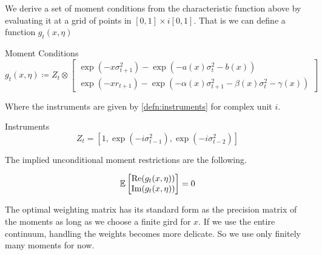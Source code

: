 \documentclass[11pt, letterpaper, twoside, final]{article}
\begin{document}
We derive a set of moment conditions from the characteristic function above by evaluating it at a grid of points
in $[0,1] \times i [0,1]$. 
That is we can define a function $g_t(x, \eta)$

\begin{defn}{Moment Conditions}
    \begin{equation}
        g_t(x, \eta) \coloneqq Z_t \otimes \begin{bmatrix} \exp(- x \sigma^2_{t+1}) - \exp\left( - a(x) \sigma_t^2
        - b(x) \right) \\ \exp\left(- x r_{t+1}\right) - \exp\left(- \alpha(x) \sigma^2_{t+1} - \beta(x)
        \sigma^2_t - \gamma(x)\right) \end{bmatrix}
    \end{equation}
\end{defn}

Where the instruments are given by \cref{defn:instruments} for complex unit $i$. 

\begin{defn}{Instruments}
    \label{defn:instruments}
    \begin{equation}
        Z_t = \left[1, \exp\left(- i \sigma_{t-1}^2\right), \exp\left(-i \sigma^2_{t-2}\right)\right] 
    \end{equation}
\end{defn}

The implied unconditional moment restrictions are the following.  

\begin{equation}
    \operatorname{\mathbb{E}} \begin{bmatrix}  \mathrm{Re} (g_t(x, \eta)) \\ \mathrm{Im} (g_t(x, \eta)) \end{bmatrix} = 0
\end{equation}


The optimal weighting matrix has its standard form as the precision matrix of the moments as long as we choose a
finite gird for $x$. 
If we use the entire continuum, handling the weights becomes more delicate. 
So we use only finitely many moments for now.
\end{document}
